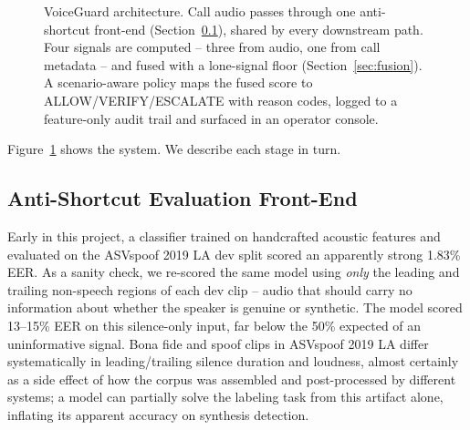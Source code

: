 \documentclass[conference]{IEEEtran}
\begin{document}
\begin{figure}[t]
{}
\caption{VoiceGuard architecture. Call audio passes through one
anti-shortcut front-end (Section~\ref{sec:frontend}), shared by every
downstream path. Four signals are computed -- three from audio, one
from call metadata -- and fused with a lone-signal floor
(Section~\ref{sec:fusion}). A scenario-aware policy maps the fused score
to ALLOW/VERIFY/ESCALATE with reason codes, logged to a feature-only
audit trail and surfaced in an operator console.}
\label{fig:architecture}
\end{figure}

Figure~\ref{fig:architecture} shows the system. We describe each stage
in turn.

\subsection{Anti-Shortcut Evaluation Front-End}
\label{sec:frontend}
Early in this project, a classifier trained on handcrafted acoustic
features and evaluated on the ASVspoof 2019 LA dev split scored an
apparently strong 1.83\% EER. As a sanity check, we re-scored the same
model using \emph{only} the leading and trailing non-speech regions of
each dev clip -- audio that should carry no information about whether
the speaker is genuine or synthetic. The model scored 13--15\% EER on
this silence-only input, far below the 50\% expected of an uninformative
signal. Bona fide and spoof clips in ASVspoof 2019 LA differ
systematically in leading/trailing silence duration and loudness,
almost certainly as a side effect of how the corpus was assembled and
post-processed by different systems; a model can partially solve the
labeling task from this artifact alone, inflating its apparent accuracy
on synthesis detection.
\end{document}
